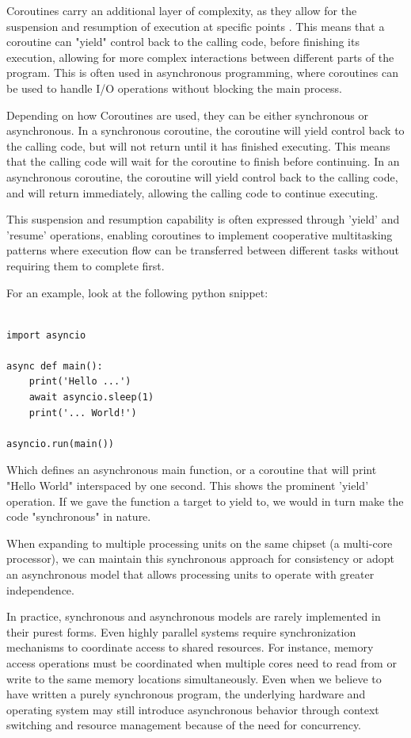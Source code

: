 \documentclass[12pt,a4paper]{article}
\begin{document}
Coroutines carry an additional layer of complexity, as they allow for the suspension and resumption of execution at specific points \parencite{DeMouna2009}. This means that a coroutine can "yield" control back to the calling code, before finishing its execution, allowing for more complex interactions between different parts of the program. This is often used in asynchronous programming, where coroutines can be used to handle I/O operations without blocking the main process. 

Depending on how Coroutines are used, they can be either synchronous or asynchronous. In a synchronous coroutine, the coroutine will yield control back to the calling code, but will not return until it has finished executing. This means that the calling code will wait for the coroutine to finish before continuing. In an asynchronous coroutine, the coroutine will yield control back to the calling code, and will return immediately, allowing the calling code to continue executing.

This suspension and resumption capability is often expressed through 'yield' and 'resume' operations, enabling coroutines to implement cooperative multitasking patterns where execution flow can be transferred between different tasks without requiring them to complete first.

For an example, look at the following python snippet:
\begin{verbatim}

import asyncio

async def main():
    print('Hello ...')
    await asyncio.sleep(1)
    print('... World!')

asyncio.run(main())
\end{verbatim}

Which defines an asynchronous main function, or a coroutine that will print "Hello World" interspaced by one second. This shows the prominent 'yield' operation. If we gave the function a target to yield to, we would in turn make the code "synchronous" in nature.

When expanding to multiple processing units on the same chipset (a multi-core processor), we can maintain this synchronous approach for consistency or adopt an asynchronous model that allows processing units to operate with greater independence. 

In practice, synchronous and asynchronous models are rarely implemented in their purest forms. Even highly parallel systems require synchronization mechanisms to coordinate access to shared resources. For instance, memory access operations must be coordinated when multiple cores need to read from or write to the same memory locations simultaneously. Even when we believe to have written a purely synchronous program, the underlying hardware and operating system may still introduce asynchronous behavior through context switching and resource management because of the need for concurrency.
\end{document}
